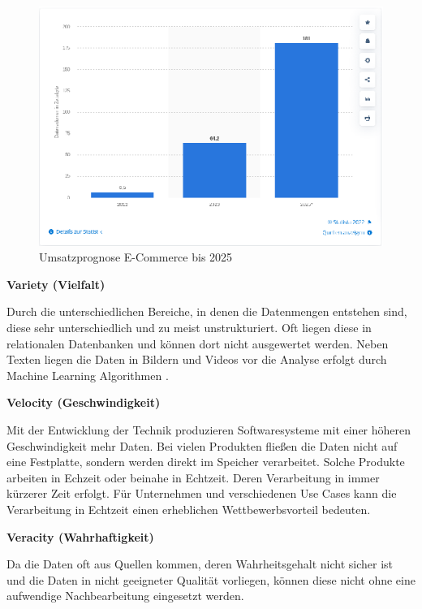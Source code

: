 \begin{figure}[!ht]
	\centering
	\includegraphics[width=\linewidth]{images/chapter2/umsatzprognose_2025.eps}
	\caption{Umsatzprognose E-Commerce bis 2025}
	\label{img:stat_prognose_2022}
\end{figure}


\textbf{Variety (Vielfalt)}\vspace{0.2cm}

Durch die unterschiedlichen Bereiche, in denen die Datenmengen entstehen sind, diese sehr unterschiedlich und zu meist unstrukturiert. Oft liegen diese in relationalen Datenbanken und können dort nicht ausgewertet werden. Neben Texten liegen die Daten in Bildern und Videos vor die Analyse erfolgt durch Machine Learning Algorithmen .\vspace{0.5cm}

\textbf{Velocity (Geschwindigkeit)}\vspace{0.2cm}

Mit der Entwicklung der Technik produzieren Softwaresysteme mit einer höheren Geschwindigkeit mehr Daten. Bei vielen Produkten fließen die Daten nicht auf eine Festplatte, sondern werden direkt im Speicher verarbeitet. Solche Produkte arbeiten in Echzeit oder beinahe in Echtzeit. Deren Verarbeitung in immer kürzerer Zeit erfolgt. Für Unternehmen und verschiedenen Use Cases kann die Verarbeitung in Echtzeit einen erheblichen Wettbewerbsvorteil bedeuten.\vspace{0.5cm}

\textbf{Veracity (Wahrhaftigkeit)}\vspace{0.2cm}

Da die Daten oft aus Quellen kommen, deren Wahrheitsgehalt nicht sicher ist und die Daten in nicht geeigneter Qualität vorliegen, können diese nicht ohne eine aufwendige Nachbearbeitung eingesetzt werden.\vspace{0.5cm}

